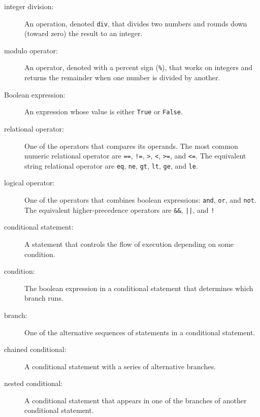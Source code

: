 \begin{description}

\item[integer division:] An operation, denoted {\tt div}, 
that divides two numbers and rounds down (toward zero) the 
result to an integer.

\item[modulo operator:]  An operator, denoted with a percent sign
({\tt \%}), that works on integers and returns the remainder when one
number is divided by another.

\item[Boolean expression:]  An expression whose value is either 
{\tt True} or {\tt False}.

\item[relational operator:] One of the operators that compares
its operands. The most common numeric relational operator are  {\tt ==}, {\tt !=}, {\tt >}, {\tt <}, {\tt >=}, and {\tt <=}. The equivalent string relational operator are {\tt eq}, {\tt ne}, {\tt gt}, {\tt lt}, {\tt ge}, and {\tt le}.

\item[logical operator:] One of the operators that combines boolean
expressions: {\tt and}, {\tt or}, and {\tt not}. The equivalent higher-precedence operators are {\tt \&\&}, {\tt ||}, and {\tt !}

\item[conditional statement:]  A statement that controls the 
flow of execution depending on some condition.

\item[condition:] The boolean expression in a conditional 
statement that determines which branch runs.

\item[branch:] One of the alternative sequences of statements in
a conditional statement.

\item[chained conditional:]  A conditional statement with a 
series of alternative branches.

\item[nested conditional:]  A conditional statement that appears
in one of the branches of another conditional statement.


\end{description}
